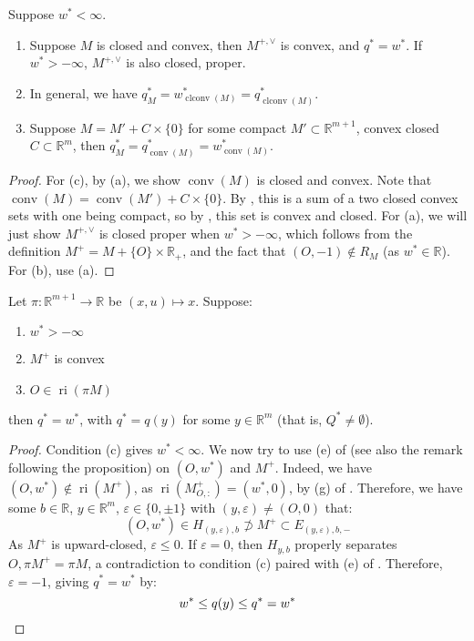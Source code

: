 \begin{coro}\label{coro:032-reachability-special-cases}Suppose $w^\ast<\infty$.
	\begin{enumerate}[label=(\alph*)]
		\item Suppose $M$ is closed and convex, then $M^{+,\vee}$ is convex, and $q^\ast=w^\ast$. If $w^\ast > -\infty$, $M^{+,\vee}$ is also closed, proper.
		\item In general, we have $q_M^\ast = w_{\operatorname{clconv}(M)}^\ast = q_{\operatorname{clconv}(M)}^\ast$.
		\item Suppose $M=M'+C\times \{0\}$ for some compact $M'\subset \mathbb{R}^{m+1}$, convex closed $C\subset \mathbb{R}^m$, then $q^\ast_{M}=q^\ast_{\operatorname{conv}(M)}=w^\ast_{\operatorname{conv}(M)}$.
	\end{enumerate}
\end{coro}
\begin{proof}
	For (c), by (a), we show $\operatorname{conv}(M)$ is closed and convex. Note that $\operatorname{conv}(M)=\operatorname{conv}(M')+C\times \{0\}$. By , this is a sum of a two closed convex sets with one being compact, so by , this set is convex and closed. For (a), we will just show $M^{+,\vee}$ is closed proper when $w^\ast > -\infty$, which follows from the definition $M^+=M+\{O\}\times \mathbb{R}_{+}$, and the fact that $(O, -1)\notin R_M$ (as $w^\ast \in \mathbb{R}$). For (b), use (a).
\end{proof}

\begin{prop}\label{prop:032-reachability}
	Let $\pi :\mathbb{R}^{m+1}\to \mathbb{R}$ be $(x,u)\mapsto x$. Suppose:
	\begin{enumerate}[label=(\alph*)]
		\item $w^\ast >-\infty$
		\item $M^+$ is convex
		\item $O\in \operatorname{ri}(\pi M)$
	\end{enumerate}
	then $q^\ast=w^\ast$, with $q^\ast=q(y)$ for some $y\in \mathbb{R}^m$ (that is, $Q^\ast\neq\emptyset$).
\end{prop}
\begin{proof}
	Condition (c) gives $w^\ast <\infty$. We now try to use (e) of  (see also the remark following the proposition) on $(O, w^\ast)$ and $M^+$. Indeed, we have $(O, w^\ast)\notin \operatorname{ri}(M^+)$, as $\operatorname{ri}(M^+_{O,:})=(w^\ast,0)$, by (g) of . Therefore, we have some $b\in \mathbb{R}$, $y\in \mathbb{R}^m$, $\varepsilon \in \{0,\pm 1\}$ with $(y,\varepsilon )\neq (O,0)$ that:
	\[
		(O,w^\ast)\in H_{(y,\varepsilon),b}\nsupset M^+ \subset E_{(y,\varepsilon ),b,-}
	\]
	As $M^+$ is upward-closed, $\varepsilon\leq 0$. If $\varepsilon =0$, then $H_{y,b}$ properly separates $O,\pi M^+=\pi M$, a contradiction to condition (c) paired with (e) of . Therefore, $\varepsilon =-1$, giving $q^\ast=w^\ast$ by:
	\[
		w^\ast \leq q(y) \leq q^\ast =w^\ast \qedhere
	\]
\end{proof}

